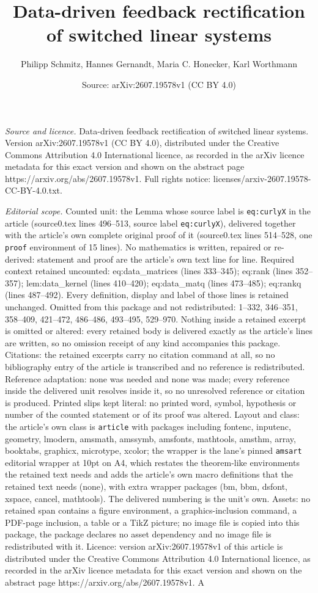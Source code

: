 \documentclass[10pt,a4paper]{amsart}
\title[Data-driven feedback rectification of switched linear system]{Data-driven feedback rectification of switched linear systems}
\author{Philipp Schmitz, Hannes Gernandt, Maria C. Honecker, Karl Worthmann}
\date{Source: arXiv:2607.19578v1 (CC BY 4.0)}
\begin{document}
\maketitle

\noindent\emph{Source and licence.} Data-driven feedback rectification of switched linear systems. Version arXiv:2607.19578v1 (CC BY 4.0), distributed under the Creative Commons Attribution 4.0 International licence, as recorded in the arXiv licence metadata for this exact version and shown on the abstract page https://arxiv.org/abs/2607.19578v1. Full rights notice: licenses/arxiv-2607.19578-CC-BY-4.0.txt.\par\smallskip

\noindent\textit{Editorial scope.} Counted unit: the Lemma whose source label is \texttt{eq:curlyX} in the article (source0.tex lines 496--513, source label \texttt{eq:curlyX}), delivered together with the article's own complete original proof of it (source0.tex lines 514--528, one \texttt{proof} environment of 15 lines). No mathematics is written, repaired or re-derived: statement and proof are the article's own text line for line. Required context retained uncounted: eq:data\_matrices (lines 333--345); eq:rank (lines 352--357); lem:data\_kernel (lines 410--420); eq:data\_matq (lines 473--485); eq:rankq (lines 487--492). Every definition, display and label of those lines is retained unchanged. Omitted from this package and not redistributed: 1--332, 346--351, 358--409, 421--472, 486--486, 493--495, 529--970. Nothing inside a retained excerpt is omitted or altered: every retained body is delivered exactly as the article's lines are written, so no omission receipt of any kind accompanies this package. Citations: the retained excerpts carry no citation command at all, so no bibliography entry of the article is transcribed and no reference is redistributed. Reference adaptation: none was needed and none was made; every reference inside the delivered unit resolves inside it, so no unresolved reference or citation is produced. Printed slips kept literal: no printed word, symbol, hypothesis or number of the counted statement or of its proof was altered. Layout and class: the article's own class is \texttt{article} with packages including fontenc, inputenc, geometry, lmodern, amsmath, amssymb, amsfonts, mathtools, amsthm, array, booktabs, graphicx, microtype, xcolor; the wrapper is the lane's pinned \texttt{amsart} editorial wrapper at 10pt on A4, which restates the theorem-like environments the retained text needs and adds the article's own macro definitions that the retained text needs (none), with extra wrapper packages (bm, bbm, dsfont, xspace, cancel, mathtools). The delivered numbering is the unit's own. Assets: no retained span contains a figure environment, a graphics-inclusion command, a PDF-page inclusion, a table or a TikZ picture; no image file is copied into this package, the package declares no asset dependency and no image file is redistributed with it. Licence: version arXiv:2607.19578v1 of this article is distributed under the Creative Commons Attribution 4.0 International licence, as recorded in the arXiv licence metadata for this exact version and shown on the abstract page https://arxiv.org/abs/2607.19578v1. A 
\end{document}
